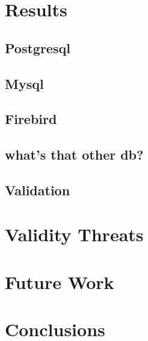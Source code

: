 \documentclass{report}
\begin{document}

\section{Results}
\subsection{Postgresql}
\subsection{Mysql}
\subsection{Firebird}
\subsection{ what's that other db?}
\subsection{Validation}
\section{Validity Threats}
\section{ Future Work}
\section{Conclusions}
\end{document}

